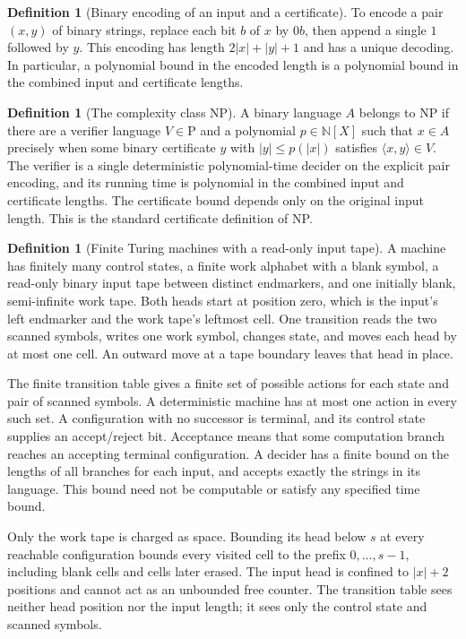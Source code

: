 \documentclass[11pt]{article}
\theoremstyle{definition}
\newtheorem{definition}[theorem]{Definition}
\begin{document}
\begin{definition}[Binary encoding of an input and a certificate]\leavevmode
To encode a pair $(x,y)$ of binary strings, replace each bit $b$ of $x$ by
$0b$, then append a single $1$ followed by $y$. This encoding has length
$2|x|+|y|+1$ and has a unique decoding. In particular, a polynomial bound in
the encoded length is a polynomial bound in the combined input and
certificate lengths.
\end{definition}

\begin{definition}[The complexity class NP]\leavevmode
A binary language $A$ belongs to $\mathrm{NP}$ if there are a verifier
language $V\in\mathrm{P}$ and a polynomial $p\in\mathbb{N}[X]$ such that
$x\in A$ precisely when some binary certificate $y$ with $|y|\le p(|x|)$
satisfies $\langle x,y\rangle\in V$.
The verifier is a single deterministic polynomial-time decider on the
explicit pair encoding, and its running time is polynomial in the combined
input and certificate lengths. The certificate bound depends only on the
original input length. This is the standard certificate definition of NP.
\end{definition}

\begin{definition}[Finite Turing machines with a read-only input tape]\leavevmode
A machine has finitely many control states, a finite work alphabet with a
blank symbol, a read-only binary input tape between distinct endmarkers,
and one initially blank, semi-infinite work tape. Both heads start at
position zero, which is the input's left endmarker and the work tape's
leftmost cell. One transition reads the two scanned symbols, writes one
work symbol, changes state, and moves each head by at most one cell.
An outward move at a tape boundary leaves that head in place.

The finite transition table gives a finite set of possible actions for
each state and pair of scanned symbols. A deterministic machine has at
most one action in every such set. A configuration with no successor is
terminal, and its control state supplies an accept/reject bit. Acceptance
means that some computation branch reaches an accepting terminal
configuration. A decider has a finite bound on the lengths of all branches
for each input, and accepts exactly the strings in its language. This
bound need not be computable or satisfy any specified time bound.

Only the work tape is charged as space. Bounding its head below $s$ at
every reachable configuration bounds every visited cell to the prefix
$0,\ldots,s-1$, including blank cells and cells later erased. The input
head is confined to $|x|+2$ positions and cannot act as an unbounded free
counter. The transition table sees neither head position nor the input
length; it sees only the control state and scanned symbols.
\end{definition}
\end{document}
